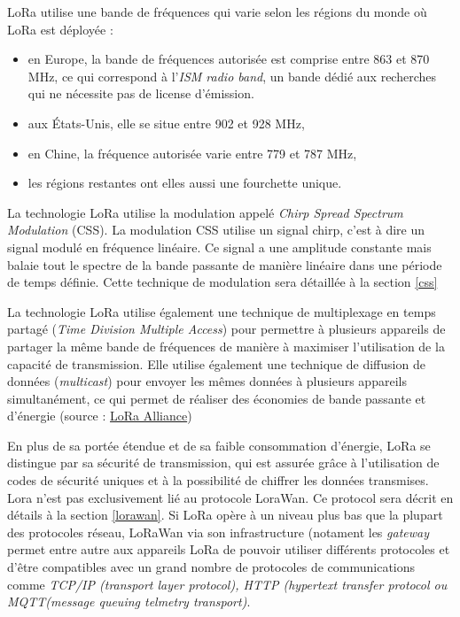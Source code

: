 \vspace{0.1cm}

LoRa utilise une bande de fréquences qui varie selon les régions du monde où LoRa est déployée :

\vspace{0.1cm}

\begin{itemize}
\item en Europe, la bande de fréquences autorisée est comprise entre 863 et 870 MHz, ce qui correspond à l'\textit{ISM radio band}, un bande dédié aux recherches qui ne nécessite pas de license d'émission.
\item aux États-Unis, elle se situe entre 902 et 928 MHz,
\item en Chine, la fréquence autorisée varie entre 779 et 787 MHz,
\item les régions restantes ont elles aussi une fourchette unique.
\end{itemize}

\vspace{0.1cm}

La technologie LoRa utilise la modulation appelé \textit{Chirp Spread Spectrum Modulation} (CSS). La modulation CSS utilise un signal chirp, c'est à dire un signal modulé en fréquence linéaire. Ce signal a une amplitude constante mais balaie tout le spectre de la bande passante de manière linéaire dans une période de temps définie. Cette technique de modulation sera détaillée à la section \ref{css}

\vspace{0.1cm}

La technologie LoRa utilise également une technique de multiplexage en temps partagé (\textit{Time Division Multiple Access}) pour permettre à plusieurs appareils de partager la même bande de fréquences de manière à maximiser l'utilisation de la capacité de transmission. Elle utilise également une technique de diffusion de données (\textit{multicast}) pour envoyer les mêmes données à plusieurs appareils simultanément, ce qui permet de réaliser des économies de bande passante et d'énergie (source : \href{https://resources.lora-alliance.org/technical-trainings/lorawan-device-to-device-multicast-communications}{LoRa Alliance})

\vspace{0.1cm}

En plus de sa portée étendue et de sa faible consommation d'énergie, LoRa se distingue par sa sécurité de transmission, qui est assurée grâce à l'utilisation de codes de sécurité uniques et à la possibilité de chiffrer les données transmises. Lora n'est pas exclusivement lié au protocole LoraWan. Ce protocol sera décrit en détails à la section \ref{lorawan}. Si LoRa opère à un niveau plus bas que la plupart des protocoles réseau, LoRaWan via son infrastructure (notament les \textit{gateway} permet entre autre aux appareils LoRa de pouvoir utiliser différents protocoles et d'être compatibles avec un grand nombre de protocoles de communications comme \textit{TCP/IP (transport layer protocol), HTTP (hypertext transfer protocol ou MQTT(message queuing telmetry transport)}.

